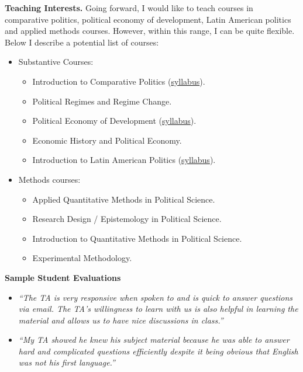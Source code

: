\documentclass[11pt]{letter} %
\begin{document}
\begin{letter}{}
{\bf Teaching Interests.} Going forward, I would like to teach courses in comparative politics, political economy of development, Latin American politics and applied methods courses. However, within this range, I can be quite flexible. Below I describe a potential list of courses:

\begin{itemize}
\item Substantive Courses:
	\begin{itemize}
	\item Introduction to Comparative Politics (\href{https://github.com/hbahamonde/Comparative_Politics_UGRAD/raw/master/Bahamonde_Comparative_Politics_Syllabus_UGRAD.pdf}{syllabus}).
	\item Political Regimes and Regime Change.
	\item Political Economy of Development (\href{https://github.com/hbahamonde/Political-Economy-Intro-UGrad/raw/master/Pol_Econ_Dev_Syllabus_UGRAD.pdf}{syllabus}).
	\item Economic History and Political Economy.
	\item Introduction to Latin American Politics (\href{https://github.com/hbahamonde/Latin_American_Politics_UGRAD/raw/master/Bahamonde_Latin_American_Politics_Syllabus_UGRAD.pdf}{syllabus}).
	\end{itemize}
\item Methods courses:
	\begin{itemize}
	\item Applied Quantitative Methods in Political Science.
	\item Research Design / Epistemology in Political Science.
	\item Introduction to Quantitative Methods in Political Science.
	\item Experimental Methodology.
	\end{itemize}
\end{itemize}


{\bf Sample Student Evaluations}

{\scriptsize
\begin{itemize}

\item \emph{``The TA is very responsive when spoken to and is quick to answer questions via email. The TA's willingness to learn with us is also helpful in learning the material and allows us to have nice discussions in class.''}

\item \emph{``My TA showed he knew his subject material because he was able to answer hard and complicated questions efficiently despite it being obvious that English was not his first language.''}


\end{itemize}}
\end{letter}
\end{document}
